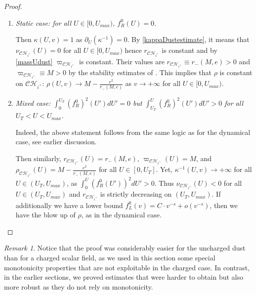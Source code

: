 \documentclass[10pt,a4paper]{article}
\theoremstyle{plain}
\theoremstyle{remark}
\newtheorem{rmk}{Remark}[section]
\theoremstyle{definition}
\theoremstyle{plain}
\theoremstyle{remark}
\theoremstyle{definition}
\newcommand{\CH}{\mathcal{CH}_{i^+}}
\numberwithin{equation}{section}
\begin{document}
\begin{proof}
\begin{enumerate}
		If additionally we have a lower bound $f_L^0(v)=C \cdot v^{-s}+o(v^{-s})$ then by the stability estimates of \cite{Moi}, $-\lambda \sim C \cdot v^{-2s}$, at least for $U$ small enough and in the future of the curve $\gamma$. Since $2\rho-r= \kappa^{-1} \cdot (-\lambda)$, $\rho(U,v) \rightarrow +\infty$ as $ v \rightarrow+\infty$, for small $U$.
		A forciciori, $\varpi(U,v) \rightarrow +\infty$ for small $U$, and by the monotonicity of \eqref{massUdust}, $\varpi(U,v) \rightarrow +\infty$ for  all $U\in [0,U_{max})$. Hence, for  all $U\in [0,U_{max})$,  $\rho(U,v) \rightarrow +\infty$ as $ v \rightarrow+\infty$.
		\item \textit{Static case: for all $U\in [0,U_{max})$, $f^0_R(U) = 0$.}
		
		Then $\kappa(U,v) = 1$ as $\partial_U (\kappa^{-1})=0$. By \eqref{kappaDustestimate}, it means that $\nu_{\CH}(U)=0$ for all $U\in [0,U_{max})$ hence $r_{\CH}$ is constant and by \eqref{massUdust} $\varpi_{\CH}$ is constant. Their values are $ r_{\CH} \equiv  r_-(M,e)>0$ and $ \varpi_{\CH} \equiv M >0$ by the stability estimates of \cite{Moi}. This implies that $\rho$ is constant on $\CH$: $\rho(U,v) \rightarrow M-\frac{e^2}{r_-(M,e)}$ as $v \rightarrow +\infty$ for all $U\in [0,U_{max})$.
		
		\item \textit{Mixed case: $\int_{0}^{U_T}(f^0_R)^2(U')dU' = 0$ but $\int_{U_T}^{U}(f^0_R)^2(U')dU' > 0$ for all $U_T<U<U_{max}$.}
		
Indeed, the above statement follows from the same logic as for the dynamical case, see earlier discussion. 
		
		Then similarly, $r_{\CH}(U)= r_-(M,e)$,  $\varpi_{\CH}(U)= M$, and $\rho_{\CH}(U)= M-\frac{e^2}{r_-(M,e)}$ for all $U \in [0,U_T]$. Yet,  $\kappa^{-1}(U,v) \rightarrow +\infty$ for all $U \in (U_T,U_{max})$, as $\int_{0}^U  (f_R^0(U'))^2dU' >0$. Thus $\nu_{\CH}(U)<0$ for all $U \in (U_T,U_{max})$ and $r_{\CH}$ is strictly decreasing on $(U_T,U_{max})$. If additionally we have a lower bound $f_L^0(v)=C \cdot v^{-s}+o(v^{-s})$, then we have the blow up of $\rho$, as in the dynamical case.
		
		
		
	\end{enumerate} \end{proof} \begin{rmk}
	Notice that the proof was considerably easier for the uncharged dust than for a charged scalar field, as we used in this section some special monotonicity properties that are not exploitable in the charged case. In contrast, in the earlier sections, we proved estimates that were harder to obtain but also more robust as they do not rely on monotonicity.%
\end{rmk}
\end{document}
